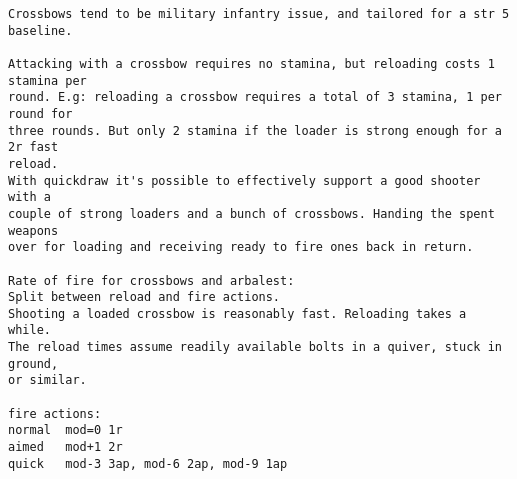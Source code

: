 \goodbreak \small \begin{samepage} \begin{verbatim}
Crossbows tend to be military infantry issue, and tailored for a str 5 baseline.

Attacking with a crossbow requires no stamina, but reloading costs 1 stamina per
round. E.g: reloading a crossbow requires a total of 3 stamina, 1 per round for
three rounds. But only 2 stamina if the loader is strong enough for a 2r fast
reload.
With quickdraw it's possible to effectively support a good shooter with a
couple of strong loaders and a bunch of crossbows. Handing the spent weapons
over for loading and receiving ready to fire ones back in return.

Rate of fire for crossbows and arbalest:
Split between reload and fire actions.
Shooting a loaded crossbow is reasonably fast. Reloading takes a while.
The reload times assume readily available bolts in a quiver, stuck in ground,
or similar.

fire actions:
normal  mod=0 1r
aimed   mod+1 2r
quick   mod-3 3ap, mod-6 2ap, mod-9 1ap


\end{verbatim}
\end{samepage}
